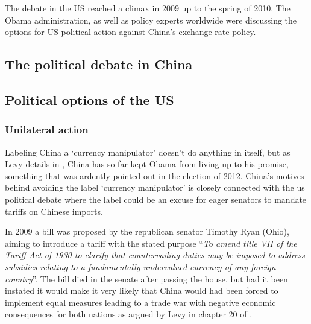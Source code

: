 
The debate in the US reached a climax in 2009 up to the spring of 2010. The Obama administration, as well as policy experts worldwide were discussing the options for US political action against China's exchange rate policy.

\subsection{The political debate in China}%

\subsection{Political options of the US}

\subsubsection{Unilateral action}

Labeling China a `currency manipulator' doesn't do anything in itself, 
but as Levy details in \cite{Levy11}, China has so far kept Obama from 
living up to his promise, something that was ardently pointed out in the 
election of 2012. China's motives behind avoiding the label `currency 
manipulator' is closely connected with the us political debate where the 
label could be an excuse for eager senators to mandate tariffs on 
Chinese imports.

In 2009 a bill was proposed by the republican senator Timothy Ryan 
(Ohio), aiming to introduce a tariff with the stated purpose 
``\textit{To amend title VII of the Tariff Act of 1930 to clarify that 
	countervailing duties may be imposed to address subsidies relating 
	to a fundamentally undervalued currency of any foreign 
country}''\cite{Ryan2009}. The bill died in the senate after passing the 
house, but had it been instated it would make it very likely that China 
would had been forced to implement equal measures leading to a trade war 
with negative economic consequences for both nations as argued by Levy 
in chapter 20 of \cite{Evenett10}.

